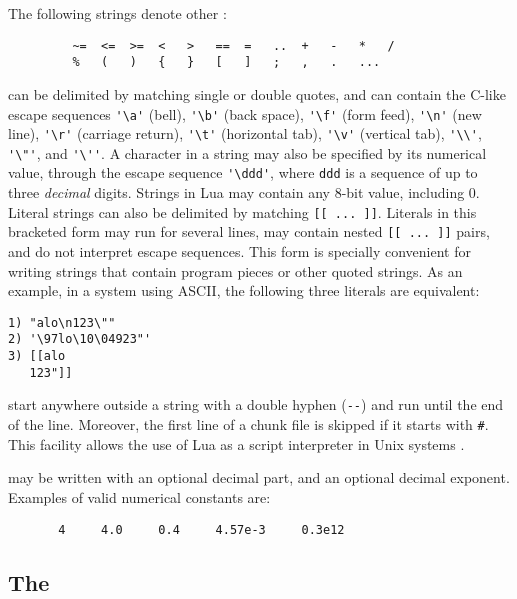 The following strings denote other :
\begin{verbatim}
         ~=  <=  >=  <   >   ==  =   ..  +   -   *   /
         %   (   )   {   }   [   ]   ;   ,   .   ...
\end{verbatim}

 can be delimited by matching single or double quotes,
and can contain the C-like escape sequences
\verb|'\a'| (bell),
\verb|'\b'| (back space),
\verb|'\f'| (form feed),
\verb|'\n'| (new line),
\verb|'\r'| (carriage return),
\verb|'\t'| (horizontal tab),
\verb|'\v'| (vertical tab),
\verb|'\\'|,
\verb|'\"'|,
and \verb|'\''|.
A character in a string may also be specified by its numerical value,
through the escape sequence \verb|'\ddd'|,
where \verb|ddd| is a sequence of up to three \emph{decimal} digits.
Strings in Lua may contain any 8-bit value, including 0.
Literal strings can also be delimited by matching \verb|[[ ... ]]|.
Literals in this bracketed form may run for several lines,
may contain nested \verb|[[ ... ]]| pairs,
and do not interpret escape sequences.
This form is specially convenient for
writing strings that contain program pieces or
other quoted strings.
As an example, in a system using ASCII,
the following three literals are equivalent:
\begin{verbatim}
1) "alo\n123\""
2) '\97lo\10\04923"'
3) [[alo
   123"]]
\end{verbatim}


 start anywhere outside a string with a
double hyphen (\verb|--|) and run until the end of the line.
Moreover,
the first line of a chunk file is skipped if it starts with \verb|#|.
This facility allows the use of Lua as a script interpreter
in Unix systems .

 may be written with an optional decimal part,
and an optional decimal exponent.
Examples of valid numerical constants are:
\begin{verbatim}
       4     4.0     0.4     4.57e-3     0.3e12
\end{verbatim}

\subsection{The } \label{pre-processor}

